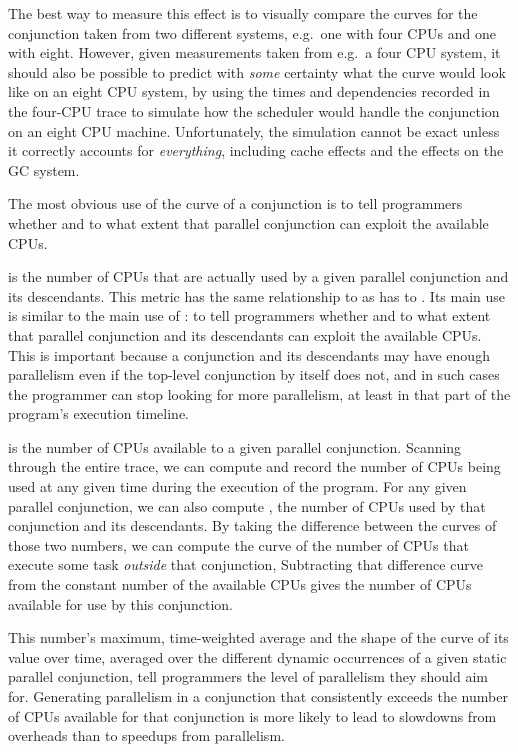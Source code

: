 The best way to measure this effect
is to visually compare the  curves for the
conjunction taken from two different systems,
e.g.\ one with four CPUs and one with eight.
However, given measurements taken from e.g.\ a four CPU system,
it should also be possible to predict with \emph{some} certainty
what the curve would look like on an eight CPU system,
by using the times and dependencies recorded in the four-CPU trace
to simulate how the scheduler would handle the conjunction
on an eight CPU machine.
Unfortunately, the simulation cannot be exact
unless it correctly accounts for \emph{everything},
including cache effects and the effects on the GC system.

The most obvious use of the  curve of a
conjunction is to tell programmers whether and to what extent
that parallel conjunction can exploit the available CPUs.

is the number of CPUs that are actually used by a given parallel conjunction
and its descendants.
This metric has the same relationship to
as  has to
.
Its main use is similar to the main use of :
to tell programmers whether and to what extent
that parallel conjunction and its descendants can exploit the available CPUs.
This is important because a conjunction and its descendants
may have enough parallelism
even if the top-level conjunction by itself does not,
and in such cases the programmer can stop looking for more parallelism,
at least in that part of the program's execution timeline.

is the number of CPUs available to a given parallel conjunction.
Scanning through the entire trace,
we can compute and record the number of CPUs being used
at any given time during the execution of the program.
For any given parallel conjunction,
we can also compute ,
the number of CPUs used by that conjunction and its descendants.
By taking the difference between the curves of those two numbers,
we can compute the curve of the number of CPUs
that execute some task \emph{outside} that conjunction,
Subtracting that difference curve
from the constant number of the available CPUs
gives the number of CPUs available for use by this conjunction.

This number's maximum, time-weighted average
and the shape of the curve of its value over time,
averaged over the different dynamic occurrences
of a given static parallel conjunction,
tell programmers the level of parallelism they should aim for.
Generating parallelism in a conjunction
that consistently exceeds the number of CPUs available for that conjunction
is more likely to lead to slowdowns from overheads
than to speedups from parallelism.

